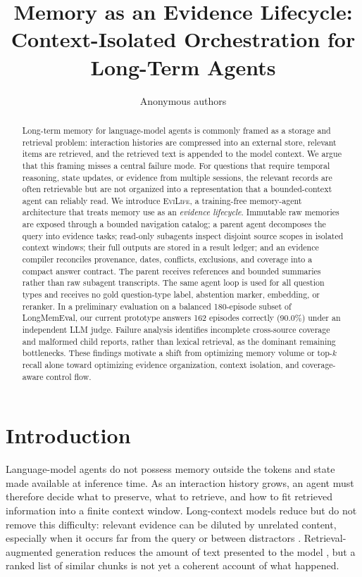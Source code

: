 \documentclass{article}
\title{Memory as an Evidence Lifecycle: Context-Isolated Orchestration for Long-Term Agents}
\author{Anonymous authors}
\newcommand{\method}{\textsc{EviLife}}
\begin{document}
\maketitle

\begin{abstract}
Long-term memory for language-model agents is commonly framed as a storage and
retrieval problem: interaction histories are compressed into an external store,
relevant items are retrieved, and the retrieved text is appended to the model
context. We argue that this framing misses a central failure mode. For questions
that require temporal reasoning, state updates, or evidence from multiple
sessions, the relevant records are often retrievable but are not organized into
a representation that a bounded-context agent can reliably read. We introduce
\method, a training-free memory-agent architecture that treats memory use as an
\emph{evidence lifecycle}. Immutable raw memories are exposed through a bounded
navigation catalog; a parent agent decomposes the query into evidence tasks;
read-only subagents inspect disjoint source scopes in isolated context windows;
their full outputs are stored in a result ledger; and an evidence compiler
reconciles provenance, dates, conflicts, exclusions, and coverage into a compact
answer contract. The parent receives references and bounded summaries rather
than raw subagent transcripts. The same agent loop is used for all question
types and receives no gold question-type label, abstention marker, embedding, or
reranker. In a preliminary evaluation on a balanced 180-episode subset of
LongMemEval, our current prototype answers 162 episodes correctly (90.0\%) under
an independent LLM judge. Failure analysis identifies incomplete cross-source
coverage and malformed child reports, rather than lexical retrieval, as the
dominant remaining bottlenecks. These findings motivate a shift from optimizing
memory volume or top-$k$ recall alone toward optimizing evidence organization,
context isolation, and coverage-aware control flow.
\end{abstract}

\section{Introduction}

Language-model agents do not possess memory outside the tokens and state made
available at inference time. As an interaction history grows, an agent must
therefore decide what to preserve, what to retrieve, and how to fit retrieved
information into a finite context window. Long-context models reduce but do not
remove this difficulty: relevant evidence can be diluted by unrelated content,
especially when it occurs far from the query or between distractors
\citep{liu2024lost}. Retrieval-augmented generation reduces the amount of text
presented to the model \citep{lewis2020rag}, but a ranked list of similar chunks
is not yet a coherent account of what happened.
\end{document}
